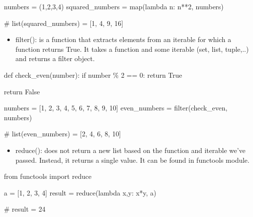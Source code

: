 \documentclass[
  letterpaper,
]{book}
\newenvironment{Shaded}{\begin{snugshade}}{\end{snugshade}}
\newcommand{\BuiltInTok}[1]{\textcolor[rgb]{0.00,0.23,0.31}{#1}}
\newcommand{\CommentTok}[1]{\textcolor[rgb]{0.37,0.37,0.37}{#1}}
\newcommand{\ControlFlowTok}[1]{\textcolor[rgb]{0.00,0.23,0.31}{#1}}
\newcommand{\DecValTok}[1]{\textcolor[rgb]{0.68,0.00,0.00}{#1}}
\newcommand{\ImportTok}[1]{\textcolor[rgb]{0.00,0.46,0.62}{#1}}
\newcommand{\KeywordTok}[1]{\textcolor[rgb]{0.00,0.23,0.31}{#1}}
\newcommand{\NormalTok}[1]{\textcolor[rgb]{0.00,0.23,0.31}{#1}}
\newcommand{\OperatorTok}[1]{\textcolor[rgb]{0.37,0.37,0.37}{#1}}
\newcommand{\VariableTok}[1]{\textcolor[rgb]{0.07,0.07,0.07}{#1}}
\providecommand{\tightlist}{%
  \setlength{\itemsep}{0pt}\setlength{\parskip}{0pt}}\usepackage{longtable,booktabs,array}
\begin{document}
\begin{Shaded}
\begin{Highlighting}[]
\NormalTok{numbers }\OperatorTok{=}\NormalTok{ (}\DecValTok{1}\NormalTok{,}\DecValTok{2}\NormalTok{,}\DecValTok{3}\NormalTok{,}\DecValTok{4}\NormalTok{)}
\NormalTok{squared\_numbers }\OperatorTok{=} \BuiltInTok{map}\NormalTok{(}\KeywordTok{lambda}\NormalTok{ n: n}\OperatorTok{**}\DecValTok{2}\NormalTok{, numbers)}

\CommentTok{\# list(squared\_numbers) = [1, 4, 9, 16]}
\end{Highlighting}
\end{Shaded}

\begin{itemize}
\tightlist
\item
  filter(): is a function that extracts elements from an iterable for
  which a function returns True. It takes a function and some iterable
  (set, list, tuple,..) and returns a filter object.
\end{itemize}

\begin{Shaded}
\begin{Highlighting}[]
\KeywordTok{def}\NormalTok{ check\_even(number):}
    \ControlFlowTok{if}\NormalTok{ number }\OperatorTok{\%} \DecValTok{2} \OperatorTok{==} \DecValTok{0}\NormalTok{:}
        \ControlFlowTok{return} \VariableTok{True}  

    \ControlFlowTok{return} \VariableTok{False}

\NormalTok{numbers }\OperatorTok{=}\NormalTok{ [}\DecValTok{1}\NormalTok{, }\DecValTok{2}\NormalTok{, }\DecValTok{3}\NormalTok{, }\DecValTok{4}\NormalTok{, }\DecValTok{5}\NormalTok{, }\DecValTok{6}\NormalTok{, }\DecValTok{7}\NormalTok{, }\DecValTok{8}\NormalTok{, }\DecValTok{9}\NormalTok{, }\DecValTok{10}\NormalTok{]}
\NormalTok{even\_numbers }\OperatorTok{=} \BuiltInTok{filter}\NormalTok{(check\_even, numbers)}

\CommentTok{\# list(even\_numbers) = [2, 4, 6, 8, 10]}
\end{Highlighting}
\end{Shaded}

\begin{itemize}
\tightlist
\item
  reduce(): does not return a new list based on the function and
  iterable we've passed. Instead, it returns a single value. It can be
  found in functools module.
\end{itemize}

\begin{Shaded}
\begin{Highlighting}[]
\ImportTok{from}\NormalTok{ functools }\ImportTok{import} \BuiltInTok{reduce}

\NormalTok{a }\OperatorTok{=}\NormalTok{ [}\DecValTok{1}\NormalTok{, }\DecValTok{2}\NormalTok{, }\DecValTok{3}\NormalTok{, }\DecValTok{4}\NormalTok{]}
\NormalTok{result }\OperatorTok{=} \BuiltInTok{reduce}\NormalTok{(}\KeywordTok{lambda}\NormalTok{ x,y: x}\OperatorTok{*}\NormalTok{y, a)}

\CommentTok{\# result = 24}
\end{Highlighting}
\end{Shaded}
\end{document}
